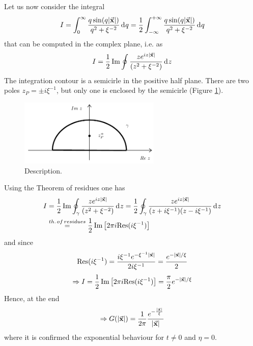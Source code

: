 \documentclass[../main/main.tex]{subfiles}
\begin{document}
Let us now consider the integral
\begin{equation}
  I = \int_{0}^{\infty } \frac{q \sin(q \abs{\va{x}} ) }{q^2 + \xi ^{-2}} \dd[]{q}
  = \frac{1}{2} \int_{- \infty }^{+ \infty } \frac{q \sin(q \abs{\va{x}} ) }{q^2 + \xi ^{-2}} \dd[]{q}
\end{equation}
that can be computed in the complex plane, i.e. as
\begin{equation}
  I = \frac{1}{2} \Im \oint \frac{z e^{i z \abs{\va{x}} } }{\qty(z^2 + \xi ^{-2}) } \dd[]{z}
\end{equation}
The integration contour is a semicirle in the positive half plane. There are two poles \( z_P = \pm i \xi ^{-1} \), but only one is enclosed by the semicirle (Figure \ref{fig:18_1}).

\begin{figure}[h!]
\centering
\includegraphics[width=0.6\textwidth]{../lessons/18_image/1.pdf}
\caption{\label{fig:18_1} Description.}
\end{figure}

Using the Theorem of residues one has
\begin{equation}
\begin{split}
I  &=  \frac{1}{2} \Im \oint_\gamma \frac{z e^{i z \abs{\va{x}} } }{\qty(z^2 + \xi ^{-2}) } \dd[]{z} = \frac{1}{2}  \oint_\gamma \frac{z e^{i z \abs{\va{x}} } }{ \qty(z + i \xi ^{-1}) \qty(z - i \xi ^{-1})  } \dd[]{z}  \\
& \overset{th.\, of\, residues}{=}  \frac{1}{2} \Im \qty[2 \pi  i \text{Res} (i \xi ^{-1})]
\end{split}
\end{equation}
and since
\begin{equation}
  \text{Res} (i \xi ^{-1}) = \frac{i \xi ^{-1} e^{- \xi ^{-1} \abs{\va{x}} } }{2 i \xi ^{-1}} = \frac{e^{-\abs{\va{x}}/\xi  } }{2}
\end{equation}
\begin{equation}
  \Rightarrow  I = \frac{1}{2} \Im \qty[2 \pi  i \text{Res} (i \xi ^{-1})] = \frac{\pi }{2} e^{- \abs{\va{x}} /\xi }
\end{equation}
Hence, at the end
\begin{equation}
  \Rightarrow G ( \abs{\va{x}} ) = \frac{1}{2 \pi } \frac{e^{- \frac{\abs{\va{x}} }{\xi }} }{\abs{\va{x}} }
\end{equation}
where it is confirmed the exponential behaviour for \( t \neq 0 \) and \( \eta =0 \).
\end{document}
